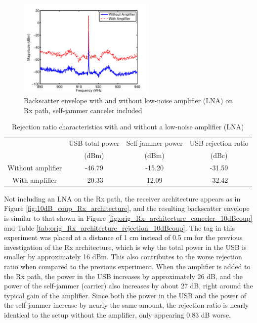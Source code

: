 \documentclass[12pt,onecolumn,titlepage]{article}
\begin{document}
\begin{figure}[h]
	\centering
	\includegraphics[width=0.6\textwidth]{Pictures/20Feb2013/BS_envelope_amplifier_comparison}
	\caption{Backscatter envelope with and without low-noise amplifier (LNA) on Rx path, self-jammer canceler included}
	\label{fig:BS_envelope_amplifier_comparison}
\end{figure}

\begin{table}[h]
\centering
	\caption{Rejection ratio characteristics with and without a low-noise amplifier (LNA)}
	\begin{tabular}{| c | c | c || c |}
	\hline
	 & USB total power & Self-jammer power  & USB rejection ratio  \\
	 & (dBm) & (dBm) & (dBc) \\ \hline
	 Without amplifier & -46.79 & -15.20 & -31.59 \\ \hline
	 With amplifier & -20.33 & 12.09 & -32.42 \\ \hline
	\end{tabular}
\label{tab:BS_envelope_amplifier_comparison}
\end{table}

Not including an LNA on the Rx path, the receiver architecture appears as in Figure \ref{fig:10dB_coup_Rx_architecture}, and the resulting backscatter envelope is similar to that shown in Figure \ref{fig:orig_Rx_architecture_canceler_10dBcoup} and Table \ref{tab:orig_Rx_architecture_rejection_10dBcoup}. The tag in this experiment was placed at a distance of 1 cm instead of 0.5 cm for the previous investigation of the Rx architecture, which is why the total power in the USB is smaller by approximately 16 dBm. This also contributes to the worse rejection ratio when compared to the previous experiment. When the amplifier is added to the Rx path, the power in the USB increases by approximately 26 dB, and the power of the self-jammer (carrier) also increases by about 27 dB, right around the typical gain of the amplifier. Since both the power in the USB and the power of the self-jammer increase by nearly the same amount, the rejection ratio is nearly identical to the setup without the amplifier, only appearing 0.83 dB worse. 
\end{document}
